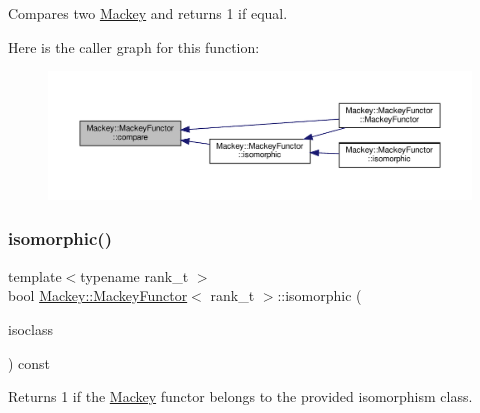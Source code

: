 Compares two \hyperlink{namespaceMackey}{Mackey} and returns 1 if equal. 

Here is the caller graph for this function\+:\nopagebreak
\begin{figure}[H]
\begin{center}
\leavevmode
\includegraphics[width=350pt]{classMackey_1_1MackeyFunctor_a001f4a56e79e68ca3fef808e6b0ccca4_icgraph}
\end{center}
\end{figure}
\mbox{\label{classMackey_1_1MackeyFunctor_a8cd5c9415c0c63c6d79dfa9b0067f416}} 
\subsubsection{\texorpdfstring{isomorphic()}{isomorphic()}\hspace{0.1cm}{\footnotesize\ttfamily [1/2]}}
{\footnotesize\ttfamily template$<$typename rank\+\_\+t $>$ \\
bool \hyperlink{classMackey_1_1MackeyFunctor}{Mackey\+::\+Mackey\+Functor}$<$ rank\+\_\+t $>$\+::isomorphic (\begin{DoxyParamCaption}\item[{const std\+::vector$<$ \hyperlink{classMackey_1_1MackeyFunctor}{Mackey\+Functor}$<$ rank\+\_\+t $>$$>$ \&}]{isoclass }\end{DoxyParamCaption}) const}



Returns 1 if the \hyperlink{namespaceMackey}{Mackey} functor belongs to the provided isomorphism class. 

